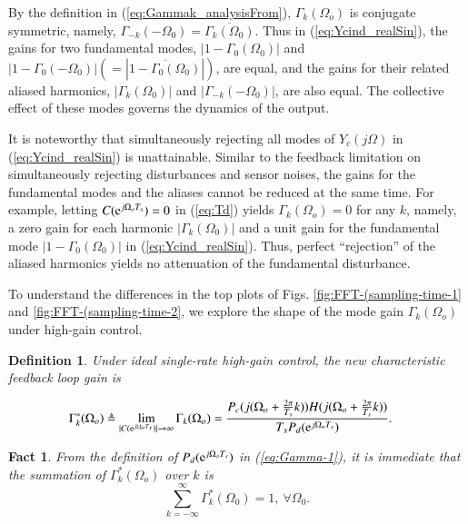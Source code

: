 \documentclass [11pt, proquest] {uwthesis}[2020/02/24]
\newtheorem{definition}{Definition}
\newtheorem{fact}{Fact}
\begin{document}
By the definition in (\ref{eq:Gammak_analysisFrom}), $\Gamma_{k}(\Omega_{o})$
is conjugate symmetric, namely, $\Gamma_{-k}(-\Omega_{0})=\overline{\Gamma_{k}(\Omega_{0})}$.
Thus in (\ref{eq:Ycind_realSin}), the gains for two fundamental modes,
$\left|1-\Gamma_{0}(\Omega_{0})\right|$ and $\left|1-\Gamma_{0}(-\Omega_{0})\right|\left(=\left|\overline{1-\Gamma_{0}(\Omega_{0})}\right|\right)$,
are equal, and the gains for their related aliased harmonics, $\left|\Gamma_{k}(\Omega_{0})\right|$
and $\left|\Gamma_{-k}(-\Omega_{0})\right|$, are also equal. The
collective effect of these modes governs the dynamics of the output.

It is noteworthy that simultaneously rejecting all modes of $Y_{c}(j\Omega)$
in (\ref{eq:Ycind_realSin}) is unattainable. Similar to the feedback
limitation on simultaneously rejecting disturbances and sensor noises,
the gains for the fundamental modes and the aliases cannot be reduced
at the same time. For example, letting $C(\mathrm{e}^{j\Omega_{o}T_{s}})=0$
in (\ref{eq:Td}) yields $\Gamma_{k}(\Omega_{o})=0$ for any $k$,
namely, a zero gain for each harmonic $\left|\Gamma_{k}(\Omega_{0})\right|$
and a unit gain for the fundamental mode $\left|1-\Gamma_{0}(\Omega_{0})\right|$
in (\ref{eq:Ycind_realSin}). Thus, perfect ``rejection'' of the
aliased harmonics yields no attenuation of the fundamental disturbance.

To understand the differences in the top plots of Figs. \ref{fig:FFT-(sampling-time-1}
and \ref{fig:FFT-(sampling-time-2}, we explore the shape of the mode
gain $\Gamma_{k}(\Omega_{o})$ under high-gain control.

\begin{definition}Under ideal single-rate high-gain control, the
new characteristic feedback loop gain is

\begin{align}
\Gamma_{k}^{*}(\Omega_{o}) & \triangleq\lim_{|C(\mathrm{e}^{j\Omega_{o}T_{s}})|\to\infty}\Gamma_{k}(\Omega_{o})=\frac{P_{c}(j(\Omega_{o}+\frac{2\pi}{T_{s}}k))H(j(\Omega_{o}+\frac{2\pi}{T_{s}}k))}{T_{s}P_{d}(\mathrm{e}^{j\Omega_{o}T_{s}})}.\label{eq:GammaStar-1}
\end{align}
\end{definition}

\noindent \begin{fact}From the definition of $P_{d}(\mathrm{e}^{j\Omega_{o}T_{s}})$
in (\ref{eq:Gamma-1}), it is immediate that the summation of $\Gamma_{k}^{*}(\Omega_{o})$
over $k$ is
\begin{equation}
\sum_{k=-\infty}^{\infty}\Gamma_{k}^{*}(\Omega_{0})=1,\ \forall\Omega_{0}.\label{eq:GammS-1-1}
\end{equation}
\end{fact}
\end{document}
